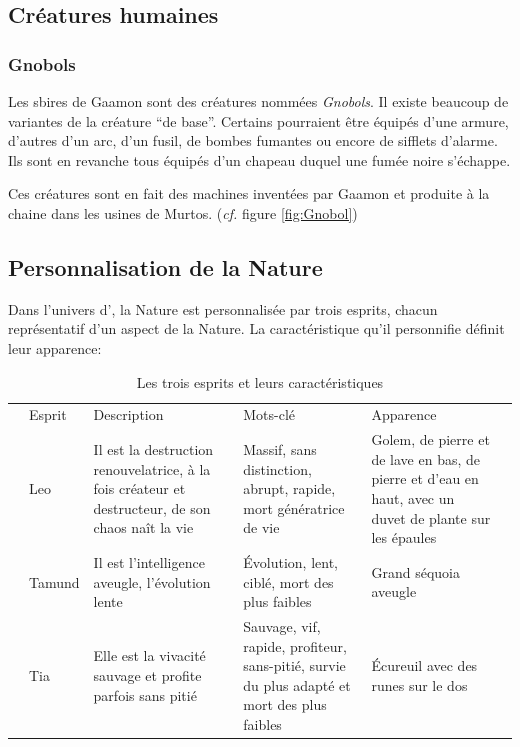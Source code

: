 \subsection{Créatures humaines}
\subsubsection{Gnobols}
\label{sec:Gnobols}
Les sbires de Gaamon sont des créatures nommées \textit{Gnobols}. Il existe beaucoup de variantes de la créature \enquote{de base}. Certains pourraient être équipés d'une armure, d'autres d'un arc, d'un fusil, de bombes fumantes ou encore de sifflets d'alarme. Ils sont en revanche tous équipés d'un chapeau duquel une fumée noire s'échappe.

Ces créatures sont en fait des machines inventées par Gaamon et produite à la chaine dans les usines de Murtos. (\textit{cf.} figure \ref{fig:Gnobol})

\subsection{Personnalisation de la Nature}
\label{sec:personnalisationNature}
Dans l'univers d'\nomUnivers, la Nature est personnalisée par trois esprits, chacun représentatif d'un aspect de la Nature. La caractéristique qu'il personnifie définit leur apparence:

\begin{table}[ht!]
	\newlength{\tableLength}
	\setlength{\tableLength}{\textwidth+2.34cm}
	
	\hspace*{-2.34cm}
	\begin{tabu} to 
		& Esprit & Description & Mots-clé & Apparence & \\
		& Leo & Il est la destruction renouvelatrice, à la fois créateur et destructeur, de son chaos naît la vie & Massif, sans distinction, abrupt, rapide, mort génératrice de vie & Golem, de pierre et de lave en bas, de pierre et d'eau en haut, avec un duvet de plante sur les épaules & \\
		& Tamund & Il est l'intelligence aveugle, l'évolution lente & Évolution, lent, ciblé, mort des plus faibles & Grand séquoia aveugle & \\
		& Tia & Elle est la vivacité sauvage et profite parfois sans pitié & Sauvage, vif, rapide, profiteur, sans-pitié, survie du plus adapté et mort des plus faibles & Écureuil avec des runes sur le dos & \\
	\end{tabu}
	
	\caption{Les trois esprits et leurs caractéristiques}
\end{table}

